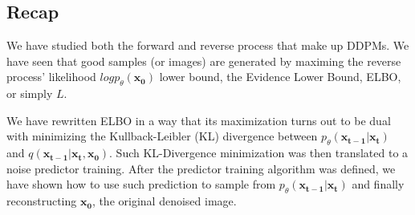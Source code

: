 \documentclass{article}
\begin{document}
\subsection{Recap}

We have studied both the forward and reverse process that make up DDPMs. We have seen that good samples (or images) are generated by maximing the reverse process' likelihood $log p_\theta(\mathbf{x_0})$ lower bound, the Evidence Lower Bound, ELBO, or simply $L$. 

We have rewritten ELBO in a way that its maximization turns out to be dual with minimizing the Kullback-Leibler (KL) divergence between  $p_\theta (\mathbf{x_{t-1} | x_t})$ and $q(\mathbf{x_{t-1} | x_t,  x_0})$. Such KL-Divergence minimization was then translated to a noise predictor training. After the predictor training algorithm was defined, we have shown how to use such prediction to sample from  $p_\theta (\mathbf{x_{t-1} | x_t})$ and finally reconstructing $\mathbf{x_0}$, the original denoised image.





\end{document}
